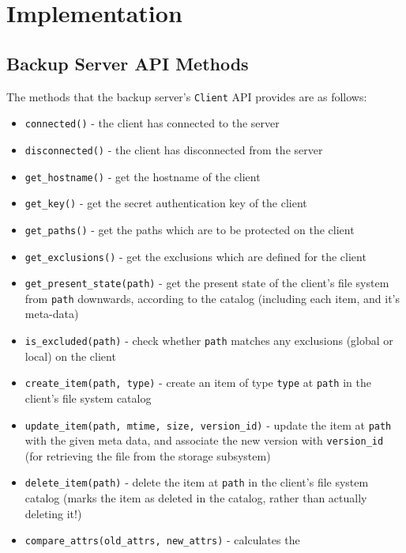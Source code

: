 \chapter{Implementation}

\section{Backup Server API Methods}
\label{sec:appendix-server-api}

The methods that the backup server's \verb!Client! API provides are as follows:

\begin{itemize}
    \item \verb!connected()! - the client has connected to the server
    \item \verb!disconnected()! - the client has disconnected from the server
    \item \verb!get_hostname()! - get the hostname of the client
    \item \verb!get_key()! - get the secret authentication key of the client
    \item \verb!get_paths()! - get the paths which are to be protected on the
        client
    \item \verb!get_exclusions()! - get the exclusions which are defined for
        the client
    \item \verb!get_present_state(path)! - get the present state of the
        client's file system from \verb!path! downwards, according to the
        catalog (including each item, and it's meta-data)
    \item \verb!is_excluded(path)! - check whether \verb!path! matches any
        exclusions (global or local) on the client
    \item \verb!create_item(path, type)! - create an item of type \verb!type!
        at \verb!path! in the client's file system catalog
    \item \verb!update_item(path, mtime, size, version_id)! - update the item
        at \verb!path! with the given meta data, and associate the new version
        with \verb!version_id! (for retrieving the file from the storage
        subsystem)
    \item \verb!delete_item(path)! - delete the item at \verb!path! in the
        client's file system catalog (marks the item as deleted in the catalog,
        rather than actually deleting it!)
    \item \verb!compare_attrs(old_attrs, new_attrs)! - calculates the

\end{itemize}
